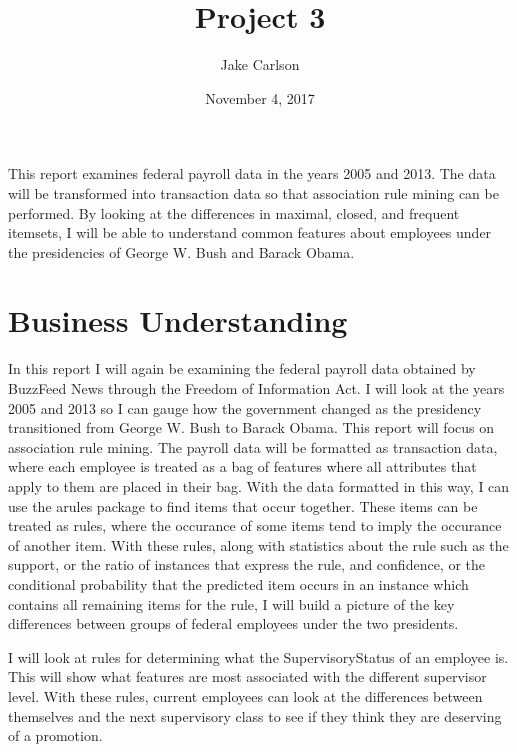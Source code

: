 \documentclass{article}
\begin{document}
\title{Project 3}
\author{Jake Carlson}
\date{November 4, 2017}
\maketitle

\abstract
This report examines federal payroll data in the years 2005 and 2013. The data will be transformed into transaction data so that association rule mining can be performed. By looking at the differences in maximal, closed, and frequent itemsets, I will be able to understand common features about employees under the presidencies of George W. Bush and Barack Obama.

\newpage

\tableofcontents
\newpage

\section{Business Understanding}
In this report I will again be examining the federal payroll data obtained by BuzzFeed News through the Freedom of Information Act. I will look at the years 2005 and 2013 so I can gauge how the government changed as the presidency transitioned from George W. Bush to Barack Obama. This report will focus on association rule mining. The payroll data will be formatted as transaction data, where each employee is treated as a bag of features where all attributes that apply to them are placed in their bag. With the data formatted in this way, I can use the arules package to find items that occur together. These items can be treated as rules, where the occurance of some items tend to imply the occurance of another item. With these rules, along with statistics about the rule such as the support, or the ratio of instances that express the rule, and confidence, or the conditional probability that the predicted item occurs in an instance which contains all remaining items for the rule, I will build a picture of the key differences between groups of federal employees under the two presidents.
\par
I will look at rules for determining what the SupervisoryStatus of an employee is. This will show what features are most associated with the different supervisor level. With these rules, current employees can look at the differences between themselves and the next supervisory class to see if they think they are deserving of a promotion.
\end{document}
